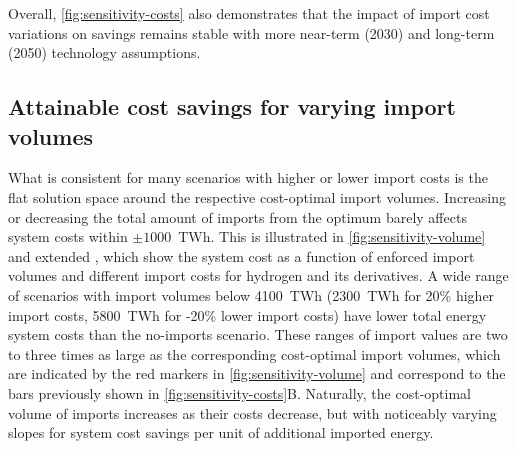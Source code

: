 Overall, \cref{fig:sensitivity-costs} also demonstrates that the impact of
import cost variations on savings remains stable with more near-term (2030) and
long-term (2050) technology assumptions.

\begin{figure}
\end{figure}

\subsection*{Attainable cost savings for varying import volumes}
\label{sec:results-5}

What is consistent for many scenarios with higher or lower import costs is the
flat solution space around the respective cost-optimal import volumes.
Increasing or decreasing the total amount of imports from the optimum barely
affects system costs within $\pm 1000$~TWh. This is illustrated in
\cref{fig:sensitivity-volume} and extended
,
which show the system cost as a function of enforced import volumes and
different import costs for hydrogen and its derivatives. A wide range of
scenarios with import volumes below 4100~TWh (2300~TWh for 20\% higher import
costs, 5800~TWh for -20\% lower import costs) have lower total energy system
costs than the no-imports scenario. These ranges of import values are two to
three times as large as the corresponding cost-optimal import volumes, which are
indicated by the red markers in \cref{fig:sensitivity-volume} and correspond to
the bars previously shown in \cref{fig:sensitivity-costs}B. Naturally, the
cost-optimal volume of imports increases as their costs decrease, but with
noticeably varying slopes for system cost savings per unit of additional
imported energy.

